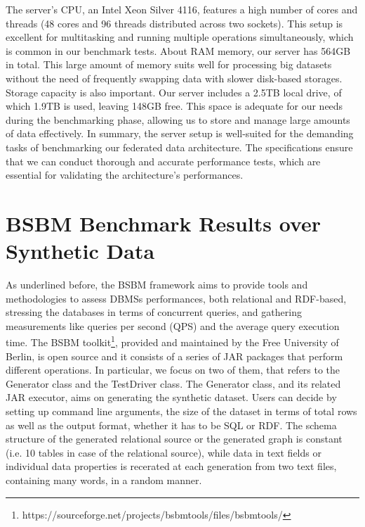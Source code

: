 The server's CPU, an Intel Xeon Silver 4116, features a high number of cores and threads (48 cores and 96 threads distributed across two sockets). This setup is excellent for multitasking and running multiple operations simultaneously, which is common in our benchmark tests.
About RAM memory, our server has 564GB in total. This large amount of memory suits well for processing big datasets without the need of frequently swapping data with slower disk-based storages.
Storage capacity is also important. Our server includes a 2.5TB local drive, of which 1.9TB is used, leaving 148GB free. This space is adequate for our needs during the benchmarking phase, allowing us to store and manage large amounts of data effectively.
In summary, the server setup is well-suited for the demanding tasks of benchmarking our federated data architecture. The specifications ensure that we can conduct thorough and accurate performance tests, which are essential for validating the architecture's performances.


\section{BSBM Benchmark Results over Synthetic Data}
As underlined before, the BSBM framework aims to provide tools and methodologies to assess DBMSs performances, both relational and RDF-based, stressing the databases in terms of concurrent queries, and gathering measurements like queries per second (QPS) and the average query execution time.
The BSBM toolkit\footnote{https://sourceforge.net/projects/bsbmtools/files/bsbmtools/}, provided and maintained by the Free University of Berlin, is open source and it consists of a series of JAR packages that perform different operations.
In particular, we focus on two of them, that refers to the Generator class and the TestDriver class. The Generator class, and its related JAR executor, aims on generating the synthetic dataset. Users can decide by setting up command line arguments, the size of the dataset in terms of total rows as well as the output format, whether it has to be SQL or RDF. The schema structure of the generated relational source or the generated graph is constant (i.e. 10 tables in case of the relational source), while data in text fields or individual data properties is recerated at each generation from two text files, containing many words, in a random manner.

